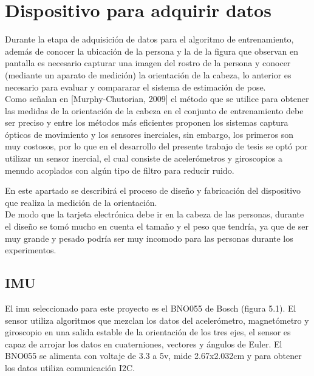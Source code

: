        \section{Dispositivo para adquirir datos}
        Durante la etapa de adquisición de datos para el algoritmo de entrenamiento, además de conocer la ubicación de la persona y la de la figura que observan en pantalla es necesario capturar una imagen del rostro de la persona y conocer (mediante un aparato de medición) la orientación de la cabeza, lo anterior es necesario para evaluar y compararar el sistema de estimación de pose. \\
        Como señalan en [Murphy-Chutorian, 2009] el método que se utilice para obtener las medidas de la orientación de la cabeza en el conjunto de entrenamiento debe ser preciso y entre los métodos más eficientes proponen los sistemas captura ópticos de movimiento y los sensores inerciales, sin embargo, los primeros son muy costosos, por lo que en el desarrollo del presente trabajo de tesis se optó por utilizar un sensor inercial, el cual consiste de acelerómetros y giroscopios a menudo acoplados con algún tipo de filtro para reducir ruido.
        
        En este apartado se describirá el proceso de diseño y fabricación del dispositivo que realiza la medición de la orientación.\\
        De modo que la tarjeta electrónica debe ir en la cabeza de las personas, durante el diseño se tomó mucho en cuenta el tamaño y el peso que tendría, ya que de ser muy grande y  pesado podría ser muy incomodo para las personas durante los experimentos. 
        \subsection{IMU}
        El imu seleccionado para este proyecto es el BNO055 de Bosch (figura 5.1). El sensor utiliza algoritmos que mezclan los datos del acelerómetro, magnetómetro y giroscopio en una salida estable de la orientación de los tres ejes, el sensor es capaz de arrojar los datos en cuaterniones, vectores y ángulos de Euler. El BNO055 se alimenta con voltaje de 3.3 a 5v, mide 2.67x2.032cm y para obtener los datos utiliza comunicación I2C.
        
